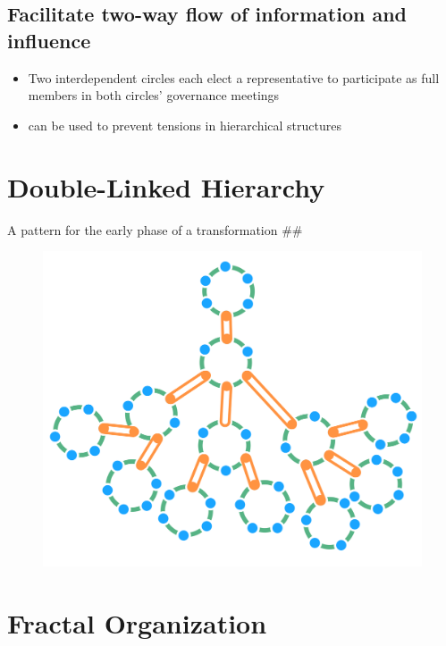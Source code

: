 \subsection{Facilitate two-way flow of information and influence}
\label{facilitatetwo-wayflowofinformationandinfluence}

\begin{itemize}
\item Two interdependent circles each elect a representative to participate as full members in both circles' governance meetings

\item can be used to prevent tensions in hierarchical structures

\end{itemize}

\section{Double-Linked Hierarchy}
\label{double-linkedhierarchy}

A pattern for the early phase of a transformation \#\#

\begin{figure}[htbp]
\centering
\includegraphics[keepaspectratio,width=\textwidth,height=0.75\textheight]{img/structural-patterns/double-linked-hierarchy.png}
\end{figure}

\section{Fractal Organization}
\label{fractalorganization}

